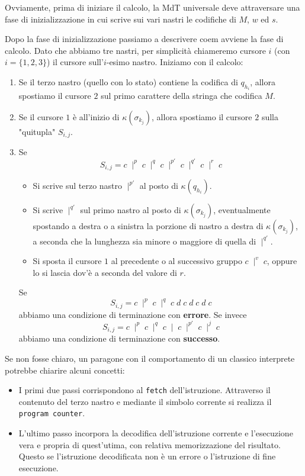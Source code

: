 Ovviamente, prima di iniziare il calcolo, la MdT universale deve
attraversare una fase di inizializzazione in cui scrive sui vari
nastri le codifiche di $M$, $w$ ed $s$.

Dopo la fase di inizializzazione passiamo a descrivere coem
avviene la fase di calcolo. Dato che abbiamo tre nastri, per
simplicità chiameremo cursore $i$ (con $i = \{ 1, 2, 3\}$) il
cursore sull'$i$-esimo nastro. Iniziamo con il calcolo:
\begin{enumerate}
	\item Se il terzo nastro (quello con lo stato) contiene la
	      codifica di $q_{h_i}$, allora spostiamo il cursore $2$
	      sul primo carattere della stringa che codifica $M$.
	\item Se il cursore $1$ è all'inizio di
	      $\kappa(\sigma_{k_j})$, allora spostiamo il cursore
	      $2$ sulla "quitupla" $S_{i,j}$.
	\item Se
	      \[
		      S_{i,j} = c \; \mid^p \; c \; \mid^q \; c \;
		      \mid^{p'} \; c \; \mid^{q'} \; c \; \mid^r \; c
	      \]
	      \begin{itemize}
		      \item Si scrive sul terzo nastro $\mid^{p'}$ al
		            posto di $\kappa(q_{h_i})$.
		      \item Si scrive $\mid^{q'}$ sul primo nastro al
		            posto di $\kappa(\sigma_{k_j})$,
		            eventualmente spostando a destra o a
		            sinistra la porzione di nastro a destra di
		            $\kappa(\sigma_{k_j})$, a seconda che la
		            lunghezza sia minore o maggiore di quella di
		            $\mid^{q'}$.
		      \item Si sposta il cursore $1$ al precedente o
		            al successivo gruppo $c \; \mid^v \; c$,
		            oppure lo si lascia dov'è a seconda del
		            valore di $r$.
	      \end{itemize}
	      Se
	      \[
		      S_{i,j} = c \; \mid^p \; c \; \mid^q \;
		      c \; d \; c \; d \; c \; d \; c
	      \]
	      abbiamo una condizione di terminazione con
	      \textbf{errore}. Se invece
	      \[
		      S_{i,j} = c \; \mid^p \; c \; \mid^q \; c \;
		      \mid \; c \; \mid^{p'} \; c \; \mid^j \; c
	      \]
	      abbiamo una condizione di terminazione con
	      \textbf{successo}.
\end{enumerate}
Se non fosse chiaro, un paragone con il comportamento di un
classico interprete potrebbe chiarire alcuni concetti:
\begin{itemize}
	\item I primi due passi corrispondono al \verb|fetch|
	      dell'istruzione. Attraverso il contenuto del terzo
	      nastro e mediante il simbolo corrente si realizza
	      il \verb|program counter|.
	\item L'ultimo passo incorpora la decodifica dell'istruzione
	      corrente e l'esecuzione vera e propria di quest'utima,
	      con relativa memorizzazione del risultato. Questo se
	      l'istruzione decodificata non è un errore o
	      l'istruzione di fine esecuzione.
\end{itemize}


